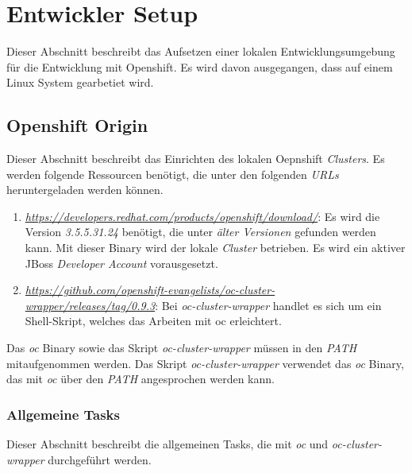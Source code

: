 \section{Entwickler Setup}
\label{sec:dev-setup}
Dieser Abschnitt beschreibt das Aufsetzen einer lokalen Entwicklungsumgebung für die Entwicklung mit Openshift. Es wird davon ausgegangen, dass auf einem Linux System gearbetiet wird.

\subsection{Openshift Origin}
Dieser Abschnitt beschreibt das Einrichten des lokalen Oepnshift \emph{Clusters}.
\newline
\newline
Es werden folgende Ressourcen benötigt, die unter den folgenden \emph{URLs} heruntergeladen werden können.
\begin{enumerate}
	\item\emph{\url{https://developers.redhat.com/products/openshift/download/}}:
	\newline
	Es wird die Version \emph{3.5.5.31.24} benötigt, die unter \emph{älter Versionen} gefunden werden kann. Mit dieser Binary wird der lokale \emph{Cluster} betrieben. 
	\newline
	Es wird ein aktiver JBoss \emph{Developer Account} vorausgesetzt.
	\item\emph{\url{https://github.com/openshift-evangelists/oc-cluster-wrapper/releases/tag/0.9.3}}:
	\newline
	Bei \emph{oc-cluster-wrapper} handlet es sich um ein Shell-Skript, welches das Arbeiten mit oc erleichtert.
\end{enumerate}
Das \emph{oc} Binary sowie das Skript \emph{oc-cluster-wrapper} müssen in den \emph{PATH} mitaufgenommen werden. Das Skript \emph{oc-cluster-wrapper} verwendet das \emph{oc} Binary, das mit \emph{oc} über den \emph{PATH} angesprochen werden kann.
\newline
\newline
\subsubsection{Allgemeine Tasks}
Dieser Abschnitt beschreibt die allgemeinen Tasks, die mit \emph{oc} und \emph{oc-cluster-wrapper} durchgeführt werden.



